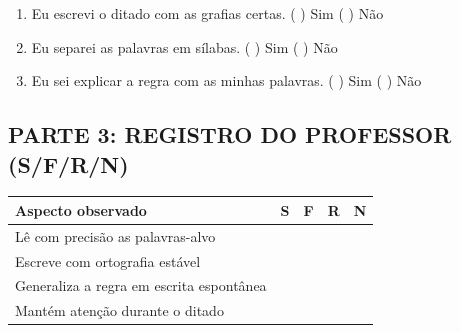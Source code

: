 \begin{exercicio}
\begin{enumerate}[label=\alph*)]
  \item Eu escrevi o ditado com as grafias certas.  \quad ( ) Sim   ( ) Não

  \item Eu separei as palavras em sílabas.  \quad ( ) Sim   ( ) Não

  \item Eu sei explicar a regra com as minhas palavras.  \quad ( ) Sim   ( ) Não

\end{enumerate}

\subsection*{PARTE 3: REGISTRO DO PROFESSOR (S/F/R/N)}

\begin{center}
\renewcommand{\arraystretch}{1.4}
\begin{tabular}{@{}p{9cm}cccc@{}}
\toprule
Aspecto observado & S & F & R & N \\
\midrule
Lê com precisão as palavras-alvo & & & & \\
Escreve com ortografia estável & & & & \\
Generaliza a regra em escrita espontânea & & & & \\
Mantém atenção durante o ditado & & & & \\
\bottomrule\end{tabular}\end{center}

\end{exercicio}



